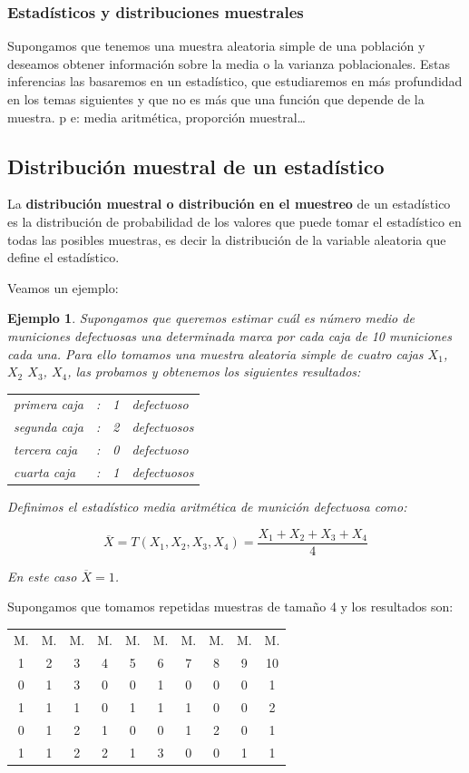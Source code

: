\documentclass[12pt]{report}
\newtheorem{example}[definition]{Ejemplo}
\begin{document}
\subsubsection{Estadísticos y distribuciones muestrales} 

Supongamos que tenemos
una muestra aleatoria simple de una población y deseamos obtener información sobre la media o la varianza
poblacionales. Estas inferencias las basaremos en un estadístico, que estudiaremos en más
profundidad en  los temas siguientes y  que no es más que una función que depende de la
muestra. p e: media aritmética, proporción muestral\ldots

\subsection{Distribución muestral de un estadístico}

La \textbf{distribución muestral  o distribución en el muestreo} de un estadístico es la
distribución de probabilidad de los valores que puede tomar el estadístico en todas las
posibles muestras, es decir la distribución de la variable aleatoria que define el
estadístico.

Veamos un ejemplo:

  \begin{example}
      Supongamos que queremos estimar cuál es número medio de
      municiones defectuosas una determinada marca por cada caja de 10 municiones cada una.
      Para ello tomamos una muestra aleatoria simple de cuatro cajas $X_{1}$, $X_{2}$
      $X_{3}$, $X_{4}$, las probamos y  obtenemos  los
      siguientes resultados:


      \begin{tabular}{lccl}
     primera caja &: & 1 &defectuoso\\
     segunda caja &: & 2 &defectuosos\\
     tercera caja &: & 0 &defectuoso\\
     cuarta  caja &: & 1 &defectuosos
     \end{tabular}

     Definimos el estadístico media aritmética de munición defectuosa como:

     $$\overline{X}=T(X_{1}, X_{2}, X_{3},
     X_{4})=\frac{X_{1}+X_{2}+X_{3}+X_{4}}{4}$$

     En este caso $\overline{X}=1$.
\end{example}

   Supongamos que tomamos repetidas muestras de tamaño 4 y los
     resultados son:
\begin{center}

     \begin{tabular}{c|c|c|c|c|c|c|c|c|c}
      M. & M. & M. & M. & M. & M. & M. & M. & M. & M.\\
1 & 2 & 3 & 4 & 5 & 6 & 7 & 8 & 9 & 10 \\ \hline 0&1&3&0&0&1&0&0&0&1\\
1&1&1&0&1&1&1&0&0&2\\ 0&1&2&1&0&0&1&2&0&1\\ 1&1&2&2&1&3&0&0&1&1
\end{tabular}
\end{center}
\end{document}
